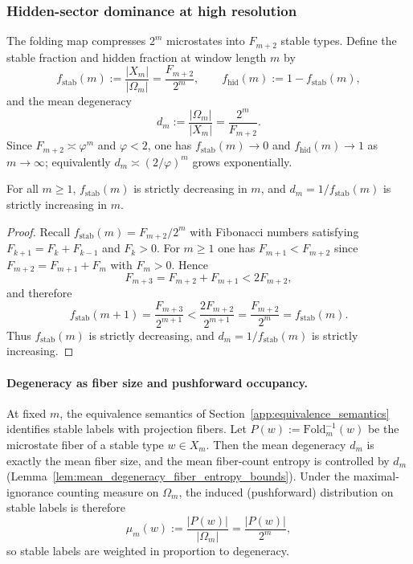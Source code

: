 \subsubsection{Hidden-sector dominance at high resolution}
\label{subsec:cosmo_hidden_fraction}

The folding map compresses $2^m$ microstates into $F_{m+2}$ stable types.
Define the stable fraction and hidden fraction at window length $m$ by
\[
f_{\mathrm{stab}}(m):=\frac{|X_m|}{|\Omega_m|}=\frac{F_{m+2}}{2^m},
\qquad
f_{\mathrm{hid}}(m):=1-f_{\mathrm{stab}}(m),
\]
and the mean degeneracy
\[
d_m:=\frac{|\Omega_m|}{|X_m|}=\frac{2^m}{F_{m+2}}.
\]
Since $F_{m+2}\asymp \varphi^m$ and $\varphi<2$, one has $f_{\mathrm{stab}}(m)\to 0$ and $f_{\mathrm{hid}}(m)\to 1$ as $m\to\infty$; equivalently $d_m\asymp (2/\varphi)^m$ grows exponentially.

\begin{lemma}\label{lem:f_stab_monotone}
\MathTag For all $m\ge 1$, $f_{\mathrm{stab}}(m)$ is strictly decreasing in $m$, and $d_m=1/f_{\mathrm{stab}}(m)$ is strictly increasing in $m$.
\end{lemma}
\begin{proof}
Recall $f_{\mathrm{stab}}(m)=F_{m+2}/2^m$ with Fibonacci numbers satisfying $F_{k+1}=F_k+F_{k-1}$ and $F_k>0$.
For $m\ge 1$ one has $F_{m+1}<F_{m+2}$ since $F_{m+2}=F_{m+1}+F_m$ with $F_m>0$.
Hence
\[
F_{m+3}=F_{m+2}+F_{m+1}<2F_{m+2},
\]
and therefore
\[
f_{\mathrm{stab}}(m+1)=\frac{F_{m+3}}{2^{m+1}}<\frac{2F_{m+2}}{2^{m+1}}=\frac{F_{m+2}}{2^m}=f_{\mathrm{stab}}(m).
\]
Thus $f_{\mathrm{stab}}(m)$ is strictly decreasing, and $d_m=1/f_{\mathrm{stab}}(m)$ is strictly increasing.
\end{proof}

\paragraph{Degeneracy as fiber size and pushforward occupancy.}
\MathTag At fixed $m$, the equivalence semantics of Section~\ref{app:equivalence_semantics} identifies stable labels with projection fibers.
Let $P(w):=\mathrm{Fold}_m^{-1}(w)$ be the microstate fiber of a stable type $w\in X_m$.
Then the mean degeneracy $d_m$ is exactly the mean fiber size, and the mean fiber-count entropy is controlled by $d_m$ (Lemma~\ref{lem:mean_degeneracy_fiber_entropy_bounds}).
Under the maximal-ignorance counting measure on $\Omega_m$, the induced (pushforward) distribution on stable labels is therefore
\[
\mu_m(w):=\frac{|P(w)|}{|\Omega_m|}=\frac{|P(w)|}{2^m},
\]
so stable labels are weighted in proportion to degeneracy.

